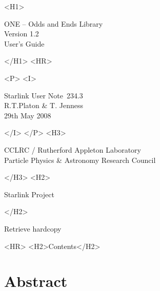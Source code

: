 \documentclass[twoside,11pt]{article}
\newcommand{\stardoccategory}  {Starlink User Note}
\newcommand{\stardocsource}    {sun\stardocnumber}
\newcommand{\stardocnumber}    {234.3}
\newcommand{\stardocauthors}   {R.T.Platon \& T. Jenness}
\newcommand{\stardocdate}      {29th May 2008}
\newcommand{\stardoctitle}     {ONE -- Odds and Ends Library}
\newcommand{\stardocversion}   {Version 1.2}
\newcommand{\stardocmanual}    {User's Guide}
\newcommand{\htmladdnormallink}[2]{#1}
\newcommand{\htmladdimg}[1]{}
\newcommand{\htmlref}[2]{#1}
\newcommand{\htmladdtonavigation}[1]{}
\newcommand{\xlabel}[1]{}
\renewcommand{\_}{\texttt{\symbol{95}}}
\begin{document}
\begin{htmlonly}
   \xlabel{}
   \begin{rawhtml} <H1> \end{rawhtml}
      \stardoctitle\\
      \stardocversion\\
      \stardocmanual
   \begin{rawhtml} </H1> <HR> \end{rawhtml}


   \begin{rawhtml} <P> <I> \end{rawhtml}
   \stardoccategory\ \stardocnumber \\
   \stardocauthors \\
   \stardocdate
   \begin{rawhtml} </I> </P> <H3> \end{rawhtml}
      \htmladdnormallink{CCLRC / Rutherford Appleton Laboratory}
                        {http://www.cclrc.ac.uk} \\
      \htmladdnormallink{Particle Physics \& Astronomy Research Council}
                        {http://www.pparc.ac.uk} \\
   \begin{rawhtml} </H3> <H2> \end{rawhtml}
      \htmladdnormallink{Starlink Project}{http://www.starlink.ac.uk/}
   \begin{rawhtml} </H2> \end{rawhtml}
   \htmladdnormallink{\htmladdimg{source.gif} Retrieve hardcopy}
      {http://www.starlink.ac.uk/cgi-bin/hcserver?\stardocsource}\\

  \label{stardoccontents}
  \begin{rawhtml} 
    <HR>
    <H2>Contents</H2>
  \end{rawhtml}
  \htmladdtonavigation{\htmlref{\htmladdimg{contents_motif.gif}}
        {stardoccontents}}

  \section{\xlabel{abstract}Abstract}
\end{htmlonly}
\end{document}
